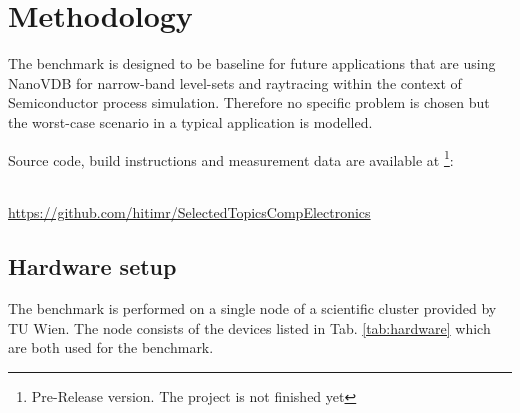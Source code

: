 \setcounter{section}{1}
\section{Methodology}






The benchmark is designed to be baseline for future applications that are using NanoVDB for narrow-band level-sets and raytracing within the context of Semiconductor process simulation.
Therefore no specific problem is chosen but the worst-case scenario in a typical application is modelled. 


Source code, build instructions and measurement data are available at \footnote{Pre-Release version. The project is not finished yet}:
\\~\\
\centerline{\url{https://github.com/hitimr/SelectedTopicsCompElectronics}}


\subsection{Hardware setup}
The benchmark is performed on a single node of a scientific cluster provided by TU Wien. 
The node consists of the devices listed in Tab. \ref{tab:hardware} which are both used for the benchmark.

